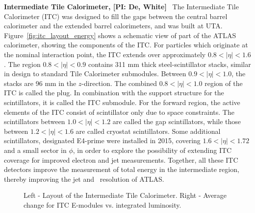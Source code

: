 \textbf{Intermediate Tile Calorimeter, [PI: De, White]} \
The Intermediate Tile Calorimeter (ITC) was designed to fill the
gaps between the central barrel calorimeter and the extended
barrel calorimeters, and was built at UTA. Figure~\ref{fig:itc_layout_energy} shows a schematic
view of part of the ATLAS calorimeter, showing the
components of the ITC. For particles which originate at the
nominal interaction point, the ITC extends over approximately $0.8
< |\eta| < 1.6$. The region $0.8 < |\eta| < 0.9$ contains 311 mm
thick steel-scintillator stacks, similar in design to standard
Tile Calorimeter submodules. Between $0.9 < |\eta| < 1.0$, the
stacks are 96 mm in the $z$-direction. The combined $0.8 < |\eta|
< 1.0$ region of the ITC is called the plug. In combination with
the support structure for the scintillators, it is called the ITC
submodule. For the forward region, the active elements of the ITC
consist of scintillator only due to space constraints. The
scintillators between $1.0 < |\eta| < 1.2$ are called the gap
scintillators, while those between $1.2 < |\eta| < 1.6$ are called
cryostat scintillators. Some additional scintillators, designated
E4-prime were installed in 2015, covering $1.6 < |\eta| < 1.72$ and
a small sector in $\phi$, in order to explore the possibility of extending
ITC coverage for improved electron and jet measurements.
Together, all these ITC detectors improve the measurement of
total energy in the intermediate region, thereby improving the jet
and \met\ resolution of ATLAS.

\begin{figure}[htb]
\centering
{}
\quad
{}

\caption{Left - Layout of the Intermediate Tile Calorimeter. Right - Average change for ITC E-modules vs. integrated luminosity.}
\end{figure} 

